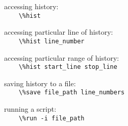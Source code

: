 accessing history:\\
{\ex \lstinline|    \%hist|}

accessing particular line of history:\\
{\ex \lstinline|    \%hist line_number|}

accessing particular range of history:\\
{\ex \lstinline|    \%hist start_line stop_line|}

saving history to a file:\\
{\ex \lstinline|    \%save file_path line_numbers|}

running a script:\\
{\ex \lstinline|    \%run -i file_path|}

